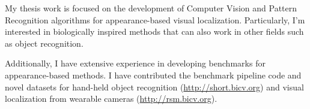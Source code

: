 My thesis work is focused on the development of Computer Vision and Pattern Recognition algorithms for appearance-based visual localization. Particularly, I'm interested in biologically inspired methods that can also work in other fields such as object recognition.

Additionally, I have extensive experience in developing benchmarks for appearance-based methods. I have contributed the benchmark pipeline code and novel datasets for hand-held object recognition (\url{http://short.bicv.org}) and visual localization from wearable cameras (\url{http://rsm.bicv.org}).

